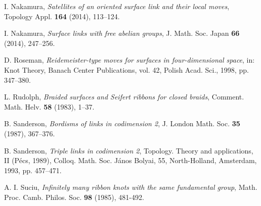 \documentclass[a4paper,11pt]{amsart}
\numberwithin{equation}{section}
\begin{document}
\begin{thebibliography}{0}
I. Nakamura, {\it Satellites of an oriented surface link and their local moves}, Topology Appl. {\bf 164} (2014), 113--124.

I. Nakamura, {\it Surface links with free abelian groups}, 
J. Math. Soc. Japan \textbf{66} (2014), 247--256.

D. Roseman, {\it Reidemeister-type moves for surfaces in four-dimensional space}, in: Knot Theory, Banach Center Publications, vol. 42, Polish Acad. Sci., 1998, pp. 347--380.

L. Rudolph, {\it Braided surfaces and Seifert ribbons for closed braids}, Comment. Math. Helv. {\bf 58} (1983), 1--37. 
 
B. Sanderson, {\it Bordisms of links in codimension 2},
J. London Math. Soc. {\bf 35} (1987), 367--376.

B. Sanderson, {\it Triple links in codimension 2},
Topology. Theory and applications, II (P\'ecs, 1989), Colloq. Math. Soc. J\'anos Bolyai, 55, North-Holland, Amsterdam, 1993, pp. 457--471. 

A. I. Suciu, 
{\it Infinitely many ribbon knots with the same fundamental group}, Math. Proc. Camb. Philos. Soc. {\bf 98} (1985), 481-492.

\end{thebibliography}
\end{document}
